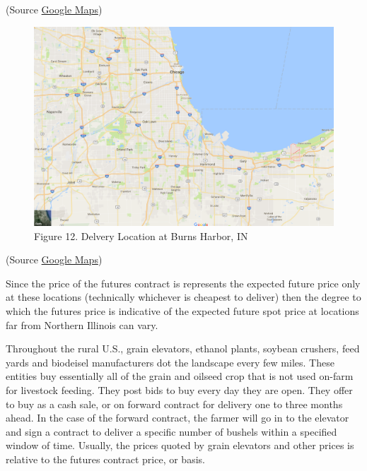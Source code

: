 \documentclass[
  letterpaper,
  DIV=11,
  numbers=noendperiod]{scrreprt}
\begin{document}
(Source \href{https://www.google.com/maps}{Google Maps})

\begin{figure}

{\centering \includegraphics{images/Burns-Harbor.png}

}

\caption{Figure 12. Delvery Location at Burns Harbor, IN}

\end{figure}

(Source
\href{https://www.google.com/maps/place/Burns+Harbor,+IN/@41.740398,-87.7248706,10.5z/data=!4m5!3m4!1s0x8811bc3712ab828d:0x98301a46014d10b5!8m2!3d41.6258708!4d-87.1333676}{Google
Maps})

Since the price of the futures contract is represents the expected
future price only at these locations (technically whichever is cheapest
to deliver) then the degree to which the futures price is indicative of
the expected future spot price at locations far from Northern Illinois
can vary.

Throughout the rural U.S., grain elevators, ethanol plants, soybean
crushers, feed yards and biodeisel manufacturers dot the landscape every
few miles. These entities buy essentially all of the grain and oilseed
crop that is not used on-farm for livestock feeding. They post bids to
buy every day they are open. They offer to buy as a cash sale, or on
forward contract for delivery one to three months ahead. In the case of
the forward contract, the farmer will go in to the elevator and sign a
contract to deliver a specific number of bushels within a specified
window of time. Usually, the prices quoted by grain elevators and other
prices is relative to the futures contract price, or basis.
\end{document}

